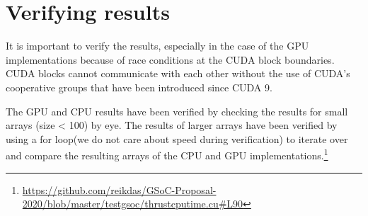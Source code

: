 \documentclass{article}
\begin{document}
\section{Verifying results}
It is important to verify the results, especially in the case of the GPU implementations because of race conditions at the CUDA block boundaries. CUDA blocks cannot communicate with each other without the use of CUDA's cooperative groups that have been introduced since CUDA 9.\par
The GPU and CPU results have been verified by checking the results for small arrays (size < 100) by eye. The results of larger arrays have been verified by using a for loop(we do not care about speed during verification) to iterate over and compare the resulting arrays of the CPU and GPU implementations.\footnote{\url{https://github.com/reikdas/GSoC-Proposal-2020/blob/master/testgsoc/thrustcputime.cu#L90}}

\pagebreak
\end{document}
